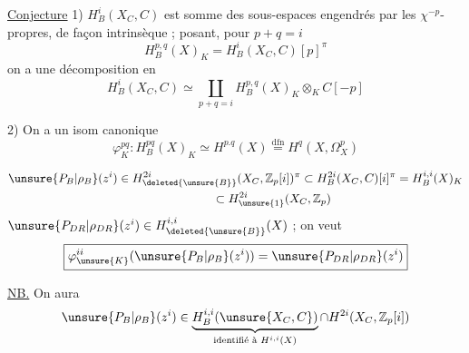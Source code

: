 
\uline{Conjecture} 1) $H_B^i(X_C,C)$ est somme  des sous-espaces engendrés par les  $\chi^{-p}$-propres, de façon intrinsèque ; posant, pour $p+q=i$
\[
H_B^{p,q}(X)_K=H_B^i(X_C,C)[p]^\pi
\]
on a une décomposition en 
\[
\boxed{H_B^i(X_C,C)\simeq\coprod_{p+q=i}H_B^{p,q}(X)_K\otimes_K C[-p]}
\]

2) On a un isom canonique
\[
\boxed{\varphi_K^{pq}:H_B^{pq}(X)_K\simeq H^{p.q}(X)\overset{\mathrm{dfn}}{=}H^q(X,\Omega_X^p)}
\]


\[
\begin{aligned}
\unsure{P_B|\rho_B}(z^i)&\in H_{\deleted{\unsure{B}}}^{2i}(X_C,\mathbb Z_p[i])^\pi
\subset H_B^{2i}(X_C,C)[i]^\pi=H_B^{i,i}(X)_K\\
&\phantom{\in H^{2i}(X_C,\mathbb Z_p[i])^\pi}\subset H_{\unsure{1}}^{2i}(X_C,\mathbb Z_p)
\end{aligned}
\]
$\unsure{P_{DR}|\rho_{DR}}(z^i)\in H_{\deleted{\unsure{B}}}^{i,i}(X)$ ; on veut
\[
\boxed{\varphi_{\unsure{K}}^{ii}(\unsure{P_B|\rho_B}(z^i))=\unsure{P_{DR}|\rho_{DR}}(z^i)}
\]

\uline{NB.} On aura
\[
\unsure{P_B|\rho_B}(z^i)\in
\underbrace{H_B^{i,i}(\unsure{X_C,C})}_{\text{identifié à }H^{i,i}(X)}
\cap H^{2i}(X_C,\mathbb Z_p[i])
\]

